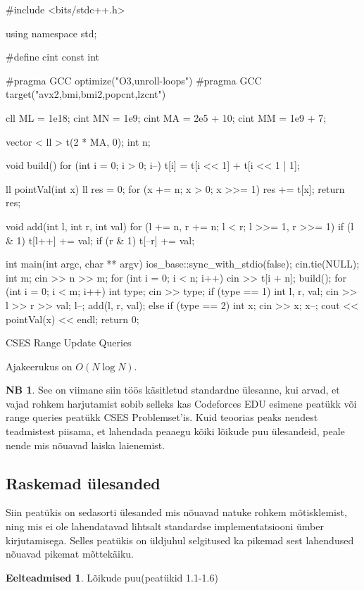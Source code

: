 \documentclass{trkut}
\theoremstyle{definition}
\newtheorem*{prereq}{Eelteadmised}
\newtheorem*{extra}{NB}
\begin{document}
\begin{cclol}
#include <bits/stdc++.h>

using namespace std;

#define cint
const int

#pragma GCC optimize("O3,unroll-loops")
#pragma GCC target("avx2,bmi,bmi2,popcnt,lzcnt")

cll ML = 1e18;
cint MN = 1e9;
cint MA = 2e5 + 10;
cint MM = 1e9 + 7;

vector < ll > t(2 * MA, 0);
int n;

void build() {
  for (int i = 0; i > 0; i--) t[i] = t[i << 1] + t[i << 1 | 1];
}

ll pointVal(int x) {
  ll res = 0;
  for (x += n; x > 0; x >>= 1) res += t[x];
  return res;
}

void add(int l, int r, int val) {
  for (l += n, r += n; l < r; l >>= 1, r >>= 1) {
    if (l & 1) t[l++] += val;
    if (r & 1) t[--r] += val;
  }
}

int main(int argc, char ** argv) {
  ios_base::sync_with_stdio(false);
  cin.tie(NULL);
  int m;
  cin >> n >> m;
  for (int i = 0; i < n; i++) {
    cin >> t[i + n];
  }
  build();
  for (int i = 0; i < m; i++) {
    int type;
    cin >> type;
    if (type == 1) {
      int l, r, val;
      cin >> l >> r >> val;
      l--;
      add(l, r, val);
    } else if (type == 2) {
      int x;
      cin >> x;
      x--;
      cout << pointVal(x) << endl;
    }
  }
  return 0;
}
    \end{cclol}
    \begin{kk}[H]
    \caption{CSES Range Update Queries}%
    \end{kk}

Ajakeerukus on $O(N\log N)$.


\begin{extra}
See on viimane siin töös käsitletud standardne ülesanne, kui arvad, et vajad rohkem harjutamist sobib selleks kas Codeforces EDU esimene peatükk või range queries peatükk CSES Problemset'is. 
Kuid teoorias peaks nendest teadmistest piisama, et lahendada peaaegu kõiki lõikude puu ülesandeid, peale nende mis nõuavad laiska laienemist.
\end{extra}


    
\subsection{Raskemad ülesanded}
Siin peatükis on sedasorti ülesanded mis nõuavad natuke rohkem mõtisklemist, ning mis ei ole lahendatavad lihtsalt standardse implementatsiooni ümber kirjutamisega.
Selles peatükis on üldjuhul selgitused ka pikemad sest lahendused nõuavad pikemat mõttekäiku.
\begin{prereq}
Lõikude puu(peatükid 1.1-1.6)
\end{prereq}
\end{document}
